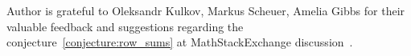 ﻿Author is grateful to Oleksandr Kulkov, Markus Scheuer, Amelia Gibbs for their valuable feedback and suggestions
regarding the conjecture~\eqref{conjecture:row_sums} at MathStackExchange discussion~\cite{kolosov2024_mse_iterated}.
